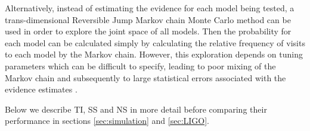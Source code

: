 \documentclass[aps,reprint,amsmath,amssymb,showpacs,showkeys]{revtex4-1}%
\newcommand{\cb}{ \color{blue}}
\begin{document}
Alternatively, instead of estimating the evidence for each model being tested, a trans-dimensional Reversible Jump Markov chain Monte Carlo \citep[RJMCMC;][]{Green:1995, Umstatter:2005} method can be used in order to explore the joint space of all models.  Then the probability for each model can be calculated simply by calculating the relative frequency of visits to each model by the Markov chain.  However, this exploration depends on tuning parameters which can be difficult to specify, leading to poor mixing of the Markov chain and subsequently to large statistical errors associated with the evidence estimates \citep{Cornish:2014}.


Below we describe TI, SS and NS in more detail before comparing their performance in sections \ref{sec:simulation} and \ref{sec:LIGO}.
\end{document}
